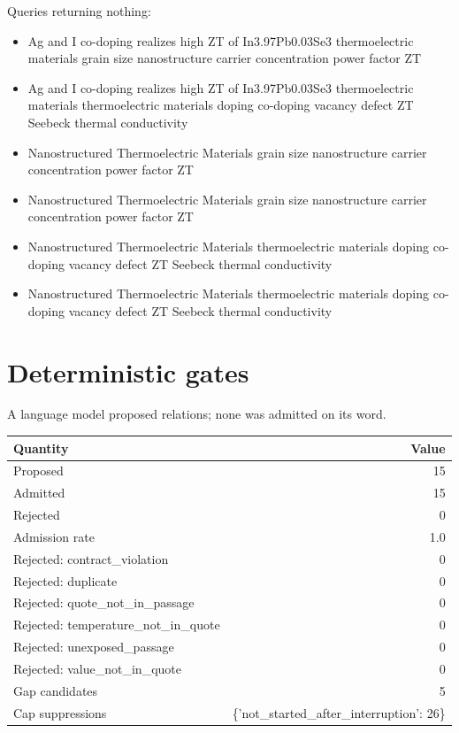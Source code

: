 \documentclass[11pt,a4paper]{article}
\begin{document}
Queries returning nothing:
\begin{itemize}
\item Ag and I co-doping realizes high ZT of In3.97Pb0.03Se3 thermoelectric materials grain size nanostructure carrier concentration power factor ZT
\item Ag and I co-doping realizes high ZT of In3.97Pb0.03Se3 thermoelectric materials thermoelectric materials doping co-doping vacancy defect ZT Seebeck thermal conductivity
\item Nanostructured Thermoelectric Materials grain size nanostructure carrier concentration power factor ZT
\item Nanostructured Thermoelectric Materials grain size nanostructure carrier concentration power factor ZT
\item Nanostructured Thermoelectric Materials thermoelectric materials doping co-doping vacancy defect ZT Seebeck thermal conductivity
\item Nanostructured Thermoelectric Materials thermoelectric materials doping co-doping vacancy defect ZT Seebeck thermal conductivity
\end{itemize}

\section{Deterministic gates}
A language model proposed relations; none was admitted on its word.

\begin{tabular}{lr}
\toprule
Quantity & Value \\
\midrule
Proposed & 15 \\
Admitted & 15 \\
Rejected & 0 \\
Admission rate & 1.0 \\
Rejected: contract\_violation & 0 \\
Rejected: duplicate & 0 \\
Rejected: quote\_not\_in\_passage & 0 \\
Rejected: temperature\_not\_in\_quote & 0 \\
Rejected: unexposed\_passage & 0 \\
Rejected: value\_not\_in\_quote & 0 \\
Gap candidates & 5 \\
Cap suppressions & \{'not\_started\_after\_interruption': 26\} \\
\bottomrule
\end{tabular}
\end{document}

